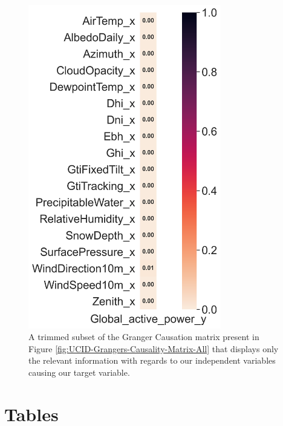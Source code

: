 \begin{figure}[H]
    \centering
    \includegraphics[width=0.75\textwidth]{Images/Chapter 5/UCID/UCID-Grangers-Causality-Matrix-Single.png}
    \caption{A trimmed subset of the Granger Causation matrix present in Figure \ref{fig:UCID-Grangers-Causality-Matrix-All} that displays only the relevant information with regards to our independent variables causing our target variable.}
    \label{fig:UCID-Grangers-Causality-Matrix-Single}
\end{figure}


\section{Tables}
\label{sec:Appendix:Tables}

